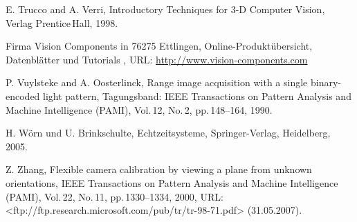 \begin{thebibliography}{Ti}
 E. Trucco and A. Verri, \glqq Introductory Techniques for 3-D Computer Vision\grqq, Verlag Prentice\,Hall, 1998.

 Firma Vision Components in 76275 Ettlingen, Online-Produktübersicht, Datenblätter und Tutorials , URL: \url{http://www.vision-components.com}

 P. Vuylsteke and A. Oosterlinck, \glqq Range image acquisition with a single binary-encoded light pattern\grqq, Tagungsband: IEEE Transactions on Pattern Analysis and Machine Intelligence (PAMI), Vol.\,12, No.\,2, pp.\,148--164, 1990.

 H. Wörn und U. Brinkschulte, \glqq Echtzeitsysteme\grqq, Springer-Verlag, Heidelberg, 2005.

 Z. Zhang, \glqq Flexible camera calibration by viewing a plane from unknown orientations\grqq, IEEE Transactions on Pattern Analysis and Machine Intelligence (PAMI), Vol.\,22, No.\,11, pp.\,1330--1334, 2000, URL: <ftp://ftp.research.microsoft.com/pub/tr/tr-98-71.pdf> (31.05.2007).

\end{thebibliography}


